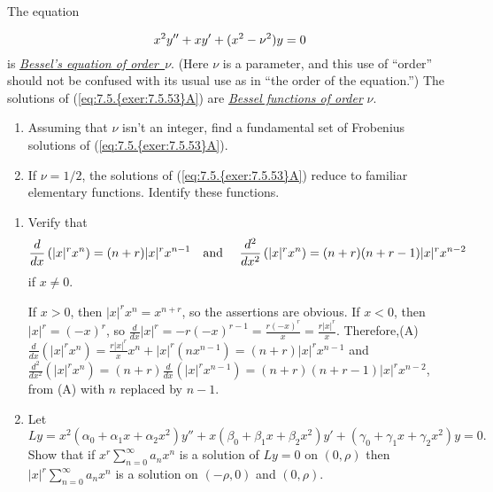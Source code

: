 \documentclass{ximera}
\begin{document}
\begin{problem}\label{exer:7.5.53}
The equation

\begin{equation} \label{eq:7.5.{exer:7.5.53}A}
 x^2y''+xy'+(x^2-\nu^2)y=0
\end{equation}
is
\href{http://www-history.mcs.st-and.ac.uk/Mathematicians/Bessel.html}
 {\color{blue}\it Bessel's equation of order~$\nu$\/}.
(Here $\nu$ is a parameter, and this use of ``order'' should not be
confused with its usual use as in ``the order of the equation.'') The
solutions of (\ref{eq:7.5.{exer:7.5.53}A}) are
\href{http://www-history.mcs.st-and.ac.uk/Mathematicians/Bessel.html}
{\color{blue}\it Bessel
functions of order\/} $\nu$.
\begin{enumerate}
\item %
Assuming that $\nu$ isn't
an integer, find a fundamental set of Frobenius solutions of
(\ref{eq:7.5.{exer:7.5.53}A}).
\item %
 If $\nu=1/2$, the solutions of
(\ref{eq:7.5.{exer:7.5.53}A}) reduce to familiar elementary functions. Identify these
functions.
\end{enumerate}
\end{problem}

\begin{problem}\label{exer:7.5.54}
\begin{enumerate}
\item %
Verify that
$$
\frac{d}{dx}\left(|x|^rx^n\right)=(n+r)|x|^rx^{n-1}\mbox{\quad and \quad}
\frac{d^2}{dx^2}\left(|x|^rx^n\right)=(n+r)(n+r-1)|x|^rx^{n-2}
$$
if $x\neq 0$.

\begin{solution}
    If $x>0$, then $|x|^rx^n=x^{n+r}$, so the assertions
are obvious. If $x<0$, then $|x|^r=(-x)^r$, so
$\frac{d}{ dx}|x|^r=-r(-x)^{r-1}=\frac{r(-x)^r}{ x}=\frac{r|x|^r}{ x}$.
Therefore,(A) $\frac{d}{ dx}(|x|^rx^n)=\frac{r|x|^r}{
x}x^n+|x|^r(nx^{n-1})=(n+r)|x|^rx^{n-1}$ and
$\frac{d^2}{ dx^2}(|x|^rx^n)=(n+r)\frac{d}{ dx}(|x|^rx^{n-1})=
(n+r)(n+r-1)|x|^rx^{n-2}$, from (A) with $n$ replaced by $n-1$.
\end{solution}

\item %
Let
$$
Ly=
x^2(\alpha_0+\alpha_1x+\alpha_2x^2)y''+x(\beta_0+\beta_1x+\beta_2x^2)y'
+(\gamma_0+\gamma_1x+\gamma_2x^2)y=0.
$$
 Show   that if $x^r\sum_{n=0}^\infty a_nx^n$ is a solution of
$Ly=0$ on
$(0,\rho)$ then  $|x|^r\sum_{n=0}^\infty a_nx^n$ is a solution on
$(-\rho,0)$ and $(0,\rho)$.
\end{enumerate}
\end{problem}
\end{document}
